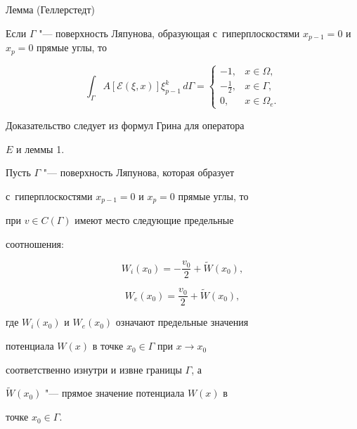 \begin{newthm}{Лемма (Геллерстедт)}


Если $\Gamma $ "--- поверхность Ляпунова, образующая с~гиперплоскостями $x_{p - 1} = 0$ и $x_p = 0$ прямые углы,  то


\begin{equation}


\label{chebotareva:eq46} \int_\Gamma A\left[


\mathcal{E}(\xi , x) \right]\xi _{p - 1}^k \,d\Gamma = 


\left\{


\begin{array}{cl}


 - 1,  & x \in \Omega ,  \\


 - \frac{1}{2},  & x \in \Gamma ,  \\


 0,  & x \in \Omega _e .


 \end{array} \right.


\end{equation}


\end{newthm}


Доказательство следует из формул Грина для оператора


$E$ и леммы 1.


\begin{theorem}[5]Пусть $\Gamma $ "--- поверхность Ляпунова, которая образует 


с~гиперплоскостями $x_{p - 1} = 0$ и $x_p = 0$ прямые углы, то


при $v \in C(\Gamma )$ имеют место следующие предельные


соотношения:


\[


W_i (x_0 ) = - \frac{v_0 }{2} + \widetilde{W}(x_0 ), 


\]


\[


W_e (x_0 ) = \frac{v_0 }{2} + \widetilde{W}(x_0 ), 


\]


где $W_i (x_0 )$ и $W_e (x_0 )$ означают предельные значения


потенциала $W(x)$ в точке $x_0 \in \Gamma$  при $x \to x_0 $


соответственно изнутри и извне границы $\Gamma$,  а


$\widetilde{W}(x_0 )$ "--- прямое значение потенциала $W(x)$ в


точке $x_0 \in \Gamma$.


\end{theorem}





